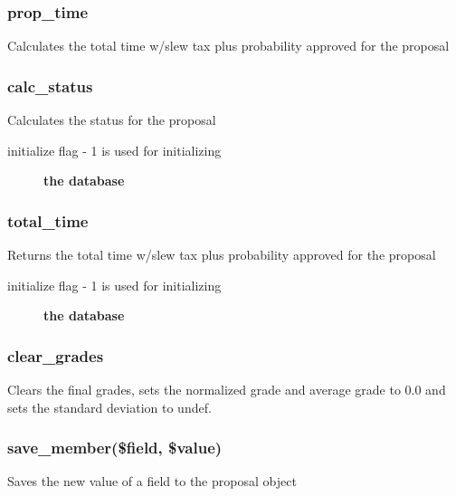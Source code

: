 \documentclass{article}
\begin{document}
\subsubsection*{prop\_time\label{Proposal_prop_time}}


Calculates the total time w/slew tax plus probability approved for the 
proposal

\subsubsection*{calc\_status\label{Proposal_calc_status}}


Calculates the status for the proposal

\begin{description}

\item[{initialize flag - 1 is used for initializing}] \textbf{the database}\end{description}
\subsubsection*{total\_time\label{Proposal_total_time}}


Returns the total time w/slew tax plus probability approved for the proposal

\begin{description}

\item[{initialize flag - 1 is used for initializing}] \textbf{the database}\end{description}
\subsubsection*{clear\_grades\label{Proposal_clear_grades}}


Clears the final grades, sets the normalized grade and average grade
to 0.0 and sets the standard deviation to undef.

\subsubsection*{save\_member(\$field, \$value)\label{Proposal_save_member_field_value_}}


Saves the new value of a field to the proposal object
\end{document}
